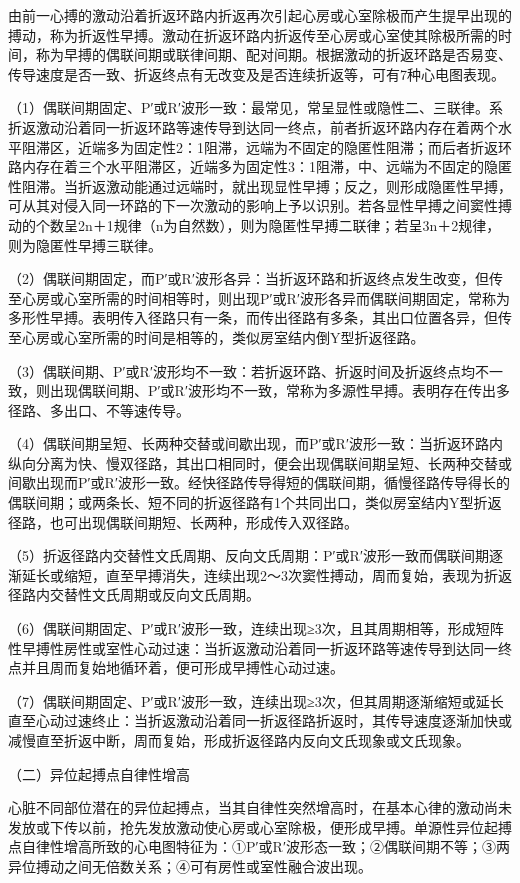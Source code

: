 由前一心搏的激动沿着折返环路内折返再次引起心房或心室除极而产生提早出现的搏动，称为折返性早搏。激动在折返环路内折返传至心房或心室使其除极所需的时间，称为早搏的偶联间期或联律间期、配对间期。根据激动的折返环路是否易变、传导速度是否一致、折返终点有无改变及是否连续折返等，可有7种心电图表现。

（1）偶联间期固定、P′或R′波形一致：最常见，常呈显性或隐性二、三联律。系折返激动沿着同一折返环路等速传导到达同一终点，前者折返环路内存在着两个水平阻滞区，近端多为固定性2：1阻滞，远端为不固定的隐匿性阻滞；而后者折返环路内存在着三个水平阻滞区，近端多为固定性3：1阻滞，中、远端为不固定的隐匿性阻滞。当折返激动能通过远端时，就出现显性早搏；反之，则形成隐匿性早搏，可从其对侵入同一环路的下一次激动的影响上予以识别。若各显性早搏之间窦性搏动的个数呈2n＋1规律（n为自然数），则为隐匿性早搏二联律；若呈3n＋2规律，则为隐匿性早搏三联律。

（2）偶联间期固定，而P′或R′波形各异：当折返环路和折返终点发生改变，但传至心房或心室所需的时间相等时，则出现P′或R′波形各异而偶联间期固定，常称为多形性早搏。表明传入径路只有一条，而传出径路有多条，其出口位置各异，但传至心房或心室所需的时间是相等的，类似房室结内倒Y型折返径路。

（3）偶联间期、P′或R′波形均不一致：若折返环路、折返时间及折返终点均不一致，则出现偶联间期、P′或R′波形均不一致，常称为多源性早搏。表明存在传出多径路、多出口、不等速传导。

（4）偶联间期呈短、长两种交替或间歇出现，而P′或R′波形一致：当折返环路内纵向分离为快、慢双径路，其出口相同时，便会出现偶联间期呈短、长两种交替或间歇出现而P′或R′波形一致。经快径路传导得短的偶联间期，循慢径路传导得长的偶联间期；或两条长、短不同的折返径路有1个共同出口，类似房室结内Y型折返径路，也可出现偶联间期短、长两种，形成传入双径路。

（5）折返径路内交替性文氏周期、反向文氏周期：P′或R′波形一致而偶联间期逐渐延长或缩短，直至早搏消失，连续出现2～3次窦性搏动，周而复始，表现为折返径路内交替性文氏周期或反向文氏周期。

（6）偶联间期固定、P′或R′波形一致，连续出现≥3次，且其周期相等，形成短阵性早搏性房性或室性心动过速：当折返激动沿着同一折返环路等速传导到达同一终点并且周而复始地循环着，便可形成早搏性心动过速。

（7）偶联间期固定、P′或R′波形一致，连续出现≥3次，但其周期逐渐缩短或延长直至心动过速终止：当折返激动沿着同一折返径路折返时，其传导速度逐渐加快或减慢直至折返中断，周而复始，形成折返径路内反向文氏现象或文氏现象。

（二）异位起搏点自律性增高

心脏不同部位潜在的异位起搏点，当其自律性突然增高时，在基本心律的激动尚未发放或下传以前，抢先发放激动使心房或心室除极，便形成早搏。单源性异位起搏点自律性增高所致的心电图特征为：①P′或R′波形态一致；②偶联间期不等；③两异位搏动之间无倍数关系；④可有房性或室性融合波出现。

